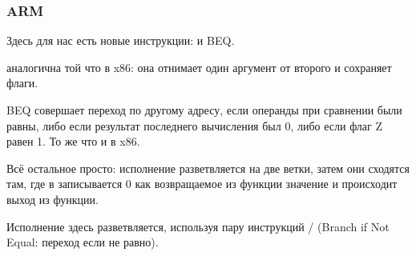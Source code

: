 \subsubsection{ARM}




Здесь для нас есть новые инструкции: \CMP и \ac{BEQ}.

\CMP аналогична той что в x86: она отнимает один аргумент от второго и сохраняет флаги.


\ac{BEQ} совершает переход по другому адресу, 
если операнды при сравнении были равны, 
либо если результат последнего вычисления был 0, либо если флаг Z равен 1.
То же что и \JZ в x86.

Всё остальное просто: исполнение разветвляется на две ветки, затем они сходятся там, 
где в  записывается 0 как возвращаемое из функции значение и происходит выход из функции.





Исполнение здесь разветвляется, используя пару инструкций / (Branch if Not Equal: переход если не равно).

